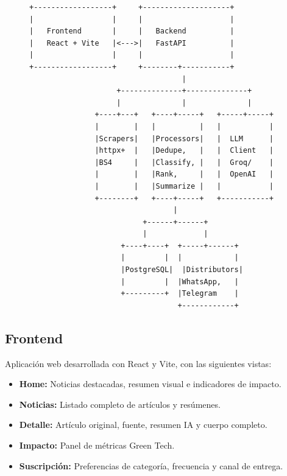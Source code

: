 \begin{figure}[H]
\centering
\begin{lstlisting}[style=plaintext, caption=Arquitectura general]
+------------------+     +--------------------+
|                  |     |                    |
|   Frontend       |     |   Backend          |
|   React + Vite   |<--->|   FastAPI          |
|                  |     |                    |
+------------------+     +--------+-----------+
                                   |
                    +--------------+--------------+
                    |              |              |
               +----+---+   +----+-----+   +-----+-----+
               |        |   |          |   |           |
               |Scrapers|   |Processors|   |  LLM      |
               |httpx+  |   |Dedupe,   |   |  Client   |
               |BS4     |   |Classify, |   |  Groq/    |
               |        |   |Rank,     |   |  OpenAI   |
               |        |   |Summarize |   |           |
               +--------+   +----+-----+   +-----------+
                                 |
                          +------+------+
                          |             |
                     +----+----+  +-----+------+
                     |         |  |            |
                     |PostgreSQL|  |Distributors|
                     |         |  |WhatsApp,   |
                     +---------+  |Telegram    |
                                  +------------+
\end{lstlisting}
\end{figure}

\subsection{Frontend}

Aplicaci\'on web desarrollada con React y Vite, con las siguientes vistas:

\begin{itemize}[nosep]
    \item \textbf{Home:} Noticias destacadas, resumen visual e indicadores de impacto.
    \item \textbf{Noticias:} Listado completo de art\'iculos y res\'umenes.
    \item \textbf{Detalle:} Art\'iculo original, fuente, resumen IA y cuerpo completo.
    \item \textbf{Impacto:} Panel de m\'etricas Green Tech.
    \item \textbf{Suscripci\'on:} Preferencias de categor\'ia, frecuencia y canal de entrega.
\end{itemize}

